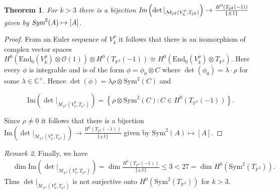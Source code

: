 \documentclass[12pt]{amsart}
\newtheorem{theorem}{Theorem}[subsection]
\theoremstyle{definition}
\theoremstyle{remark}
\newtheorem{remark}[theorem]{Remark}
\numberwithin{equation}{section}
\begin{document}
\begin{theorem}\label{det4}
For $k>3$ there is a bijection $\emph{Im}\left(\det|_{\mathcal{M}_{\mathbb{P}^2}(V_k^\rho, T_{\mathbb{P}^2})}\right)\to\frac{H^0(T_{\mathbb{P}^2}(-1))}{\{\pm 1\}}$ given by $\emph{Sym}^2(A)\mapsto [A]$.
\end{theorem}
\begin{proof}
From an Euler sequence of $V_k^\rho$ it follows that there is an isomorphism of complex vector spaces $H^0(\mbox{End}_0(V_k^\rho)\otimes\mathcal{O}(1))\otimes H^0(T_{\mathbb{P}^2}(-1))\cong H^0(\mbox{End}_0(V_k^\rho)\otimes T_{\mathbb{P}^2})$. Here every $\phi$ is integrable and is of the form $\phi = \phi_0\otimes C$ where $\det(\phi_0) = \lambda\cdot \rho$ for some $\lambda\in\mathbb{C}^\times$. Hence $\det(\phi) = \lambda\rho\otimes\mbox{Sym}^2(C)$ and 

$$\mbox{Im}\left(\det|_{\mathcal{M}_{\mathbb{P}^2}(V_k^\rho, T_{\mathbb{P}^2})}\right) = \left\{\rho\otimes\mbox{Sym}^2(C): C\in H^0(T_{\mathbb{P}^2}(-1))\right\}.$$

Since $\rho\neq 0$ it follows that there is a bijection $\mbox{Im}\left(\det|_{\mathcal{M}_{\mathbb{P}^2}(V_k^\rho, T_{\mathbb{P}^2})}\right)\to\frac{H^0(T_{\mathbb{P}^2}(-1))}{\{\pm 1\}}$ given by $\mbox{Sym}^2(A)\mapsto [A]$.
\end{proof}

\begin{remark}

Finally, we have
\begin{align*}
&\dim \mbox{Im}\left(\det|_{\mathcal{M}_{\mathbb{P}^2}(V_k^\rho, T_{\mathbb{P}^2})}\right) = \dim \frac{H^0(T_{\mathbb{P}^2}(-1))}{\{\pm 1\}} \leq 3 < 27 = \dim H^0(\mbox{Sym}^2(T_{\mathbb{P}^2})).
\end{align*} Thus $\det|_{\mathcal{M}_{\mathbb{P}^2}(V_k^\rho, T_{\mathbb{P}^2})}$ is not surjective onto $H^0(\mbox{Sym}^2(T_{\mathbb{P}^2}))$ for $k>3$.
\end{remark}






%
%
\printbibliography
\end{document}
